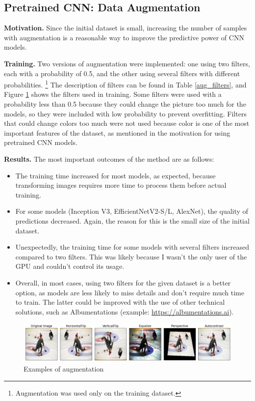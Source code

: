 \documentclass[reqno]{article}
\begin{document}
\subsection{Pretrained CNN: Data Augmentation}

\textbf{Motivation.} Since the initial dataset is small, increasing the number of samples with augmentation is a reasonable way to improve the predictive power of CNN models.

\textbf{Training.} Two versions of augmentation were implemented: one using two filters, each with a probability of 0.5, and the other using several filters with different probabilities. \footnote{Augmentation was used only on the training dataset.} The description of filters can be found in Table \ref{aug_filters}, and Figure \ref{augmentation_example} shows the filters used in training. Some filters were used with a probability less than 0.5 because they could change the picture too much for the models, so they were included with low probability to prevent overfitting. Filters that could change colors too much were not used because color is one of the most important features of the dataset, as mentioned in the motivation for using pretrained CNN models.

\textbf{Results.} The most important outcomes of the method are as follows:

\begin{itemize}
	\item The training time increased for most models, as expected, because transforming images requires more time to process them before actual training.
	\item For some models (Inception V3, EfficientNetV2-S/L, AlexNet), the quality of predictions decreased. Again, the reason for this is the small size of the initial dataset.
	\item Unexpectedly, the training time for some models with several filters increased compared to two filters. This was likely because I wasn't the only user of the GPU and couldn't control its usage.
	\item Overall, in most cases, using two filters for the given dataset is a better option, as models are less likely to miss details and don't require much time to train. The latter could be improved with the use of other technical solutions, such as Albumentations (example: \url{https://albumentations.ai}).
\end{itemize}

		\begin{figure}[ht]
			\centering
			\includegraphics[width=1\linewidth]{Augmentation.png}
			\caption{Examples of augmentation}
			\label{augmentation_example}
		\end{figure}
\end{document}
